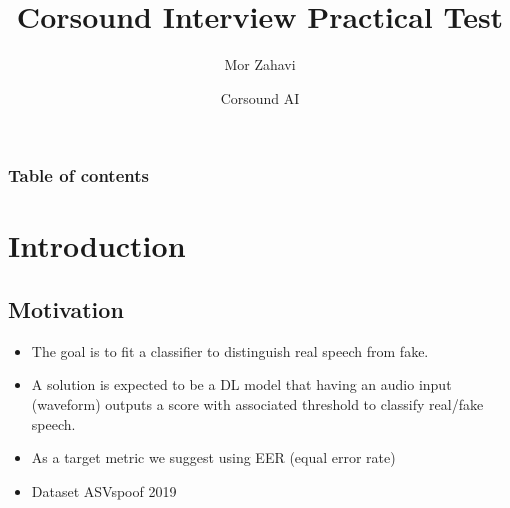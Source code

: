 \documentclass[hyperref={pdfpagelabels=false}, color=table]{beamer}
\title{Corsound Interview Practical Test}
\author{Mor Zahavi}
\date{Corsound AI}
\begin{document}
    \begin{frame}
        \titlepage
    \end{frame}
    \begin{frame}\frametitle{Table of contents}
    \tableofcontents
    \end{frame}
    \section{Introduction}
    \subsection{Motivation}
    \begin{frame}
        \begin{itemize}
            \item The goal is to fit a classifier to distinguish real speech from fake.
            \item A solution is expected to
            be a DL model that having an audio input (waveform) outputs a score with associated
            threshold to classify real/fake speech.
            \item As a target metric we suggest using EER (equal error rate)
            \item Dataset ASVspoof 2019
        \end{itemize}
            \end{frame}
\end{document}
